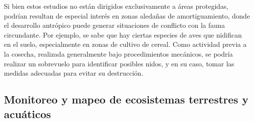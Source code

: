 \documentclass[onecolumn]{extarticle}
\begin{document}
Si bien estos estudios no están dirigidos exclusivamente a áreas
protegidas, podrían resultan de especial interés en zonas aledañas de
amortiguamiento, donde el desarrollo antrópico puede generar situaciones
de conflicto con la fauna circundante. Por ejemplo, se sabe que hay
ciertas especies de aves que nidifican en el suelo, especialmente en
zonas de cultivo de cereal. Como actividad previa a la cosecha,
realizada generalmente bajo procedimientos mecánicos, se podría realizar
un sobrevuelo para identificar posibles nidos, y en su caso, tomar las
medidas adecuadas para evitar su destrucción.

\subsection{Monitoreo y mapeo de ecosistemas terrestres y
acuáticos}\label{monitoreo-y-mapeo-de-ecosistemas-terrestres-y-acuaticos}
\end{document}
